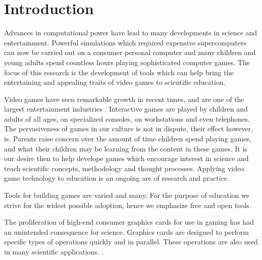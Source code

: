 \chapter{Introduction}

Advances in computational power have lead to many developments in science and
entertainment. Powerful simulations which required expensive supercomputers can
now be carried out on a consumer personal computer and many children and young
adults spend countless hours playing sophisticated computer games. The focus of
this research is the development of tools which can help bring the entertaining
and appealing traits of video games to scientific education.


Video games have seen remarkable growth in recent times, and are one of the
largest entertainment industries \cite{needed}. Interactive games are played by
children and adults of all ages, on specialized consoles, on workstations and
even telephones. The pervasiveness of games in our culture is not in dispute,
their effect however, is. Parents raise concern over the amount of time
children spend playing games, and what their children may be learning from the
content in these games. It is our desire then to help develope games which
encourage interest in science and teach scientific concepts, methodology and
thought processes. Applying video game technology to education is an ongoing
are of research and practice\cite{needed}. 


Tools for building games are varied and many. For the purpose of education we
strive for the widest possible adoption, hence we emphasize free and open
tools. 


The proliferation of high-end consumer graphics cards for use in gaming has had
an unintended consequence for science. Graphics cards are designed to perform
specific types of operations quickly and in parallel. These operations are also
used in many scientific applications.  .\cite{OpenCL}

